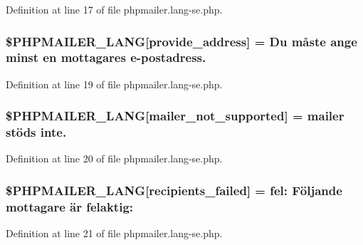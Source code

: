 Definition at line 17 of file phpmailer.\+lang-\/se.\+php.

\subsubsection[{\texorpdfstring{\$\+P\+H\+P\+M\+A\+I\+L\+E\+R\+\_\+\+L\+A\+NG}{$PHPMAILER_LANG}}]{\setlength{\rightskip}{0pt plus 5cm}\$P\+H\+P\+M\+A\+I\+L\+E\+R\+\_\+\+L\+A\+NG\mbox{[}\textquotesingle{}provide\+\_\+address\textquotesingle{}\mbox{]} = \textquotesingle{}Du måste ange minst en mottagares {\bf e}-\/postadress.\textquotesingle{}}\hypertarget{phpmailer_8lang-se_8php_a8b97897c2406b7392b056f375feeefbb}{}\label{phpmailer_8lang-se_8php_a8b97897c2406b7392b056f375feeefbb}


Definition at line 19 of file phpmailer.\+lang-\/se.\+php.

\subsubsection[{\texorpdfstring{\$\+P\+H\+P\+M\+A\+I\+L\+E\+R\+\_\+\+L\+A\+NG}{$PHPMAILER_LANG}}]{\setlength{\rightskip}{0pt plus 5cm}\$P\+H\+P\+M\+A\+I\+L\+E\+R\+\_\+\+L\+A\+NG\mbox{[}\textquotesingle{}mailer\+\_\+not\+\_\+supported\textquotesingle{}\mbox{]} = \textquotesingle{} mailer stöds inte.\textquotesingle{}}\hypertarget{phpmailer_8lang-se_8php_aa2ebcb8833ee83a7ad67401c4bb3a6ad}{}\label{phpmailer_8lang-se_8php_aa2ebcb8833ee83a7ad67401c4bb3a6ad}


Definition at line 20 of file phpmailer.\+lang-\/se.\+php.

\subsubsection[{\texorpdfstring{\$\+P\+H\+P\+M\+A\+I\+L\+E\+R\+\_\+\+L\+A\+NG}{$PHPMAILER_LANG}}]{\setlength{\rightskip}{0pt plus 5cm}\$P\+H\+P\+M\+A\+I\+L\+E\+R\+\_\+\+L\+A\+NG\mbox{[}\textquotesingle{}recipients\+\_\+failed\textquotesingle{}\mbox{]} =  fel\+: Följande mottagare är felaktig\+: \textquotesingle{}}\hypertarget{phpmailer_8lang-se_8php_a7589d30bb9b368327c2df015f3e6bcba}{}\label{phpmailer_8lang-se_8php_a7589d30bb9b368327c2df015f3e6bcba}


Definition at line 21 of file phpmailer.\+lang-\/se.\+php.

